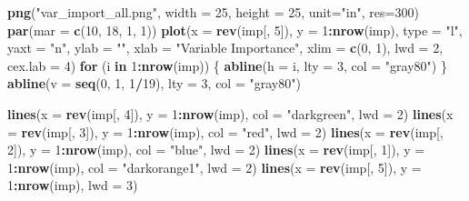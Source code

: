 \documentclass[]{book}
\newenvironment{Shaded}{\begin{snugshade}}{\end{snugshade}}
\newcommand{\KeywordTok}[1]{\textcolor[rgb]{0.13,0.29,0.53}{\textbf{{#1}}}}
\newcommand{\DataTypeTok}[1]{\textcolor[rgb]{0.13,0.29,0.53}{{#1}}}
\newcommand{\DecValTok}[1]{\textcolor[rgb]{0.00,0.00,0.81}{{#1}}}
\newcommand{\StringTok}[1]{\textcolor[rgb]{0.31,0.60,0.02}{{#1}}}
\newcommand{\ControlFlowTok}[1]{\textcolor[rgb]{0.13,0.29,0.53}{\textbf{{#1}}}}
\newcommand{\OperatorTok}[1]{\textcolor[rgb]{0.81,0.36,0.00}{\textbf{{#1}}}}
\newcommand{\NormalTok}[1]{{#1}}
\theoremstyle{definition}
\theoremstyle{definition}
\theoremstyle{definition}
\theoremstyle{remark}
\begin{document}
\begin{Shaded}
\begin{Highlighting}[]
\KeywordTok{png}\NormalTok{(}\StringTok{"var_import_all.png"}\NormalTok{, }\DataTypeTok{width =} \DecValTok{25}\NormalTok{, }\DataTypeTok{height =} \DecValTok{25}\NormalTok{, }\DataTypeTok{unit=}\StringTok{"in"}\NormalTok{, }\DataTypeTok{res=}\DecValTok{300}\NormalTok{)}
\KeywordTok{par}\NormalTok{(}\DataTypeTok{mar =} \KeywordTok{c}\NormalTok{(}\DecValTok{10}\NormalTok{, }\DecValTok{18}\NormalTok{, }\DecValTok{1}\NormalTok{, }\DecValTok{1}\NormalTok{))}
\KeywordTok{plot}\NormalTok{(}\DataTypeTok{x =} \KeywordTok{rev}\NormalTok{(imp[, }\DecValTok{5}\NormalTok{]), }\DataTypeTok{y =} \DecValTok{1}\OperatorTok{:}\KeywordTok{nrow}\NormalTok{(imp), }\DataTypeTok{type =} \StringTok{"l"}\NormalTok{, }\DataTypeTok{yaxt =} \StringTok{"n"}\NormalTok{, }
     \DataTypeTok{ylab =} \StringTok{""}\NormalTok{, }\DataTypeTok{xlab =} \StringTok{"Variable Importance"}\NormalTok{,}
     \DataTypeTok{xlim =} \KeywordTok{c}\NormalTok{(}\DecValTok{0}\NormalTok{, }\DecValTok{1}\NormalTok{), }\DataTypeTok{lwd =} \DecValTok{2}\NormalTok{, }\DataTypeTok{cex.lab =} \DecValTok{4}\NormalTok{)}
\ControlFlowTok{for}\NormalTok{ (i }\ControlFlowTok{in} \DecValTok{1}\OperatorTok{:}\KeywordTok{nrow}\NormalTok{(imp)) \{}
  \KeywordTok{abline}\NormalTok{(}\DataTypeTok{h =}\NormalTok{ i, }\DataTypeTok{lty =} \DecValTok{3}\NormalTok{, }\DataTypeTok{col =} \StringTok{"gray80"}\NormalTok{)}
\NormalTok{\}}
\KeywordTok{abline}\NormalTok{(}\DataTypeTok{v =} \KeywordTok{seq}\NormalTok{(}\DecValTok{0}\NormalTok{, }\DecValTok{1}\NormalTok{, }\DecValTok{1}\OperatorTok{/}\DecValTok{19}\NormalTok{), }\DataTypeTok{lty =} \DecValTok{3}\NormalTok{, }\DataTypeTok{col =} \StringTok{"gray80"}\NormalTok{)}

\KeywordTok{lines}\NormalTok{(}\DataTypeTok{x =} \KeywordTok{rev}\NormalTok{(imp[, }\DecValTok{4}\NormalTok{]), }\DataTypeTok{y =} \DecValTok{1}\OperatorTok{:}\KeywordTok{nrow}\NormalTok{(imp), }\DataTypeTok{col =} \StringTok{"darkgreen"}\NormalTok{, }\DataTypeTok{lwd =} \DecValTok{2}\NormalTok{)}
\KeywordTok{lines}\NormalTok{(}\DataTypeTok{x =} \KeywordTok{rev}\NormalTok{(imp[, }\DecValTok{3}\NormalTok{]), }\DataTypeTok{y =} \DecValTok{1}\OperatorTok{:}\KeywordTok{nrow}\NormalTok{(imp), }\DataTypeTok{col =} \StringTok{"red"}\NormalTok{, }\DataTypeTok{lwd =} \DecValTok{2}\NormalTok{)}
\KeywordTok{lines}\NormalTok{(}\DataTypeTok{x =} \KeywordTok{rev}\NormalTok{(imp[, }\DecValTok{2}\NormalTok{]), }\DataTypeTok{y =} \DecValTok{1}\OperatorTok{:}\KeywordTok{nrow}\NormalTok{(imp), }\DataTypeTok{col =} \StringTok{"blue"}\NormalTok{, }\DataTypeTok{lwd =} \DecValTok{2}\NormalTok{)}
\KeywordTok{lines}\NormalTok{(}\DataTypeTok{x =} \KeywordTok{rev}\NormalTok{(imp[, }\DecValTok{1}\NormalTok{]), }\DataTypeTok{y =} \DecValTok{1}\OperatorTok{:}\KeywordTok{nrow}\NormalTok{(imp), }\DataTypeTok{col =} \StringTok{"darkorange1"}\NormalTok{, }\DataTypeTok{lwd =} \DecValTok{2}\NormalTok{)}
\KeywordTok{lines}\NormalTok{(}\DataTypeTok{x =} \KeywordTok{rev}\NormalTok{(imp[, }\DecValTok{5}\NormalTok{]), }\DataTypeTok{y =} \DecValTok{1}\OperatorTok{:}\KeywordTok{nrow}\NormalTok{(imp), }\DataTypeTok{lwd =} \DecValTok{3}\NormalTok{)}


\end{Highlighting}
\end{Shaded}
\end{document}
